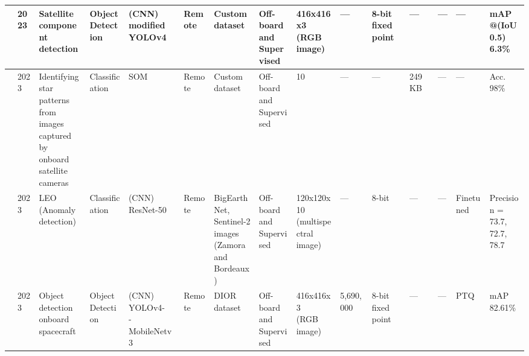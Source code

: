 \begin{center}
{\begin{tabular}{lllllllllllllll}
\cite{ekbladResourceconstrainedFPGADesign2023} & 2023 & \makecell[tl]{Satellite\\ component\\ detection} & \makecell[tl]{Object\\ Detection} & \makecell[tl]{(CNN)\\ modified YOLOv4} & Remote & \makecell[tl]{Custom\\ dataset} & \makecell[tl]{Off-board\\ and\\ Supervised} & \makecell[tl]{416x416x3\\ (RGB image)} & --- & \makecell[tl]{8-bit\\ fixed point} & --- & --- & --- & \makecell[tl]{mAP\\ @(IoU 0.5)\\ 6.3\%} \\ \hline
\cite{carmeliAIBasedRealTimeStar2023} & 2023 & \makecell[tl]{Identifying\\ star patterns\\ from images\\ captured by\\ onboard satellite\\ cameras} & Classification & SOM & Remote & \makecell[tl]{Custom\\ dataset} & \makecell[tl]{Off-board\\ and\\ Supervised} & 10 & --- & --- & 249 KB & --- & --- & Acc. 98\% \\ \hline
\cite{cocaFPGAAcceleratorMetaRecognition2023} & 2023 & \makecell[tl]{LEO\\(Anomaly\\ detection)} & Classification & \makecell[tl]{(CNN)\\ ResNet-50} & Remote & \makecell[tl]{BigEarthNet,\\ Sentinel-2\\ images (Zamora\\ and Bordeaux)} & \makecell[tl]{Off-board\\ and\\ Supervised} & \makecell[tl]{120x120x10\\ (multispectral\\ image)} & --- & 8-bit & --- & --- & Finetuned & \makecell[tl]{Precision =\\ 73.7, 72.7,\\ 78.7} \\ \hline
\cite{zhaoHardwareAccelerationSatellite2023} & 2023 & \makecell[tl]{Object detection\\ onboard spacecraft} & \makecell[tl]{Object\\ Detection} & \makecell[tl]{(CNN)\\ YOLOv4-\\-MobileNetv3} & Remote & DIOR dataset & \makecell[tl]{Off-board\\ and\\ Supervised} & \makecell[tl]{416x416x3\\ (RGB image)} & 5,690,000 & \makecell[tl]{8-bit\\ fixed point} & --- & --- & PTQ & mAP 82.61\% \\ \hline

\end{tabular}}
\end{center}
